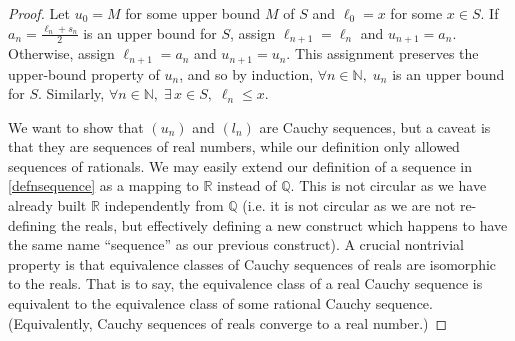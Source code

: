 \documentclass{article}
\theoremstyle{definition}
\begin{document}
\begin{proof}
	Let $u_0=M$ for some upper bound $M$ of $S$ and $\ell_0=x$ for some $x\in S$. If $a_n=\frac{\ell_n+s_n}{2}$ is an upper bound for $S$, assign $\ell_{n+1}=\ell_n$ and $u_{n+1}=a_n$. Otherwise, assign $\ell_{n+1}=a_n$ and $u_{n+1}=u_n$. This assignment preserves the upper-bound property of $u_n$, and so by induction, $\forall n\in \mathbb{N},\;u_n$ is an upper bound for $S$. Similarly, $\forall n\in \mathbb{N},\;\exists\,x\in S,\;\ell_n\leq x$.\par

	We want to show that $(u_n)$ and $(l_n)$ are Cauchy sequences, but a caveat is that they are sequences of real numbers, while our definition only allowed sequences of rationals. We may easily extend our definition of a sequence in \ref{defnsequence} as a mapping to $\mathbb{R}$ instead of $\mathbb{Q}$. This is not circular as we have already built $\mathbb{R}$ independently from $\mathbb{Q}$ (i.e. it is not circular as we are not re-defining the reals, but effectively defining a new construct which happens to have the same name ``sequence'' as our previous construct). A crucial nontrivial property is that equivalence classes of Cauchy sequences of reals are isomorphic to the reals. That is to say, the equivalence class of a real Cauchy sequence is equivalent to the equivalence class of some rational Cauchy sequence. (Equivalently, Cauchy sequences of reals converge to a real number.)\par


\end{proof}
\end{document}
